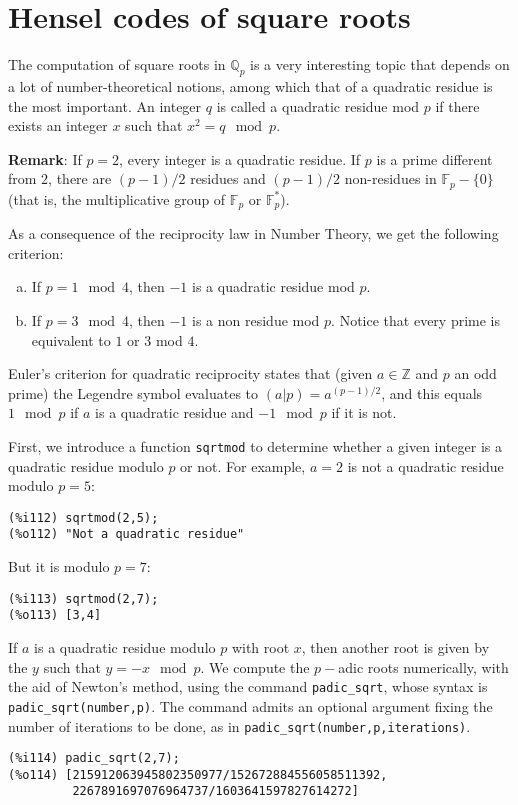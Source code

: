 \documentclass[fleqn]{cas-sc}
\begin{document}
\section{Hensel codes of square roots}\label{sec6}

\noindent The computation of square roots in $\mathbb{Q}_p$ is a very interesting
topic that depends on a lot of number-theoretical notions, among which that of a
quadratic residue is the most important.
An integer $q$ is called a quadratic residue mod $p$ if there exists an
integer $x$ such that  $x^2 =q \mod p$.

\noindent\textbf{Remark}: If $p=2$, every integer is a quadratic residue. 
If $p$ is a prime different from $2$, there are $(p-1)/2$ residues and 
$(p-1)/2$ non-residues in $\mathbb{F}_p-\{0\}$ (that is, the multiplicative
group of $\mathbb{F}_p$ or $\mathbb{F}^*_p$).

As a consequence of the reciprocity law in Number Theory, we get the following criterion:
\begin{enumerate}[(a)]\renewcommand{\theenumi}{\alph{enumi}}
	\item If $p=1 \mod 4$, then $-1$ is a quadratic residue mod $p$.
	\item If $p=3 \mod 4$, then $-1$ is a non residue mod $p$.
	Notice that every prime is equivalent to $1$ or $3$ mod $4$.
\end{enumerate}

Euler's criterion for quadratic reciprocity states that (given $a \in \mathbb{Z}$
and $p$ an odd prime) the Legendre symbol evaluates to $(a|p)=a^{(p-1)/2}$, 
and this equals $1\mod p$  if $a$ is a quadratic residue and $-1\mod p$ if it is not.

First, we introduce a function \texttt{sqrtmod} to determine whether a given integer
is a quadratic residue modulo $p$ or not. For example, $a=2$ is not a quadratic residue
modulo $p=5$:
\begin{verbatim}
(%i112)	sqrtmod(2,5);
(%o112)	"Not a quadratic residue"
\end{verbatim}
But it is modulo $p=7$:
\begin{verbatim}
(%i113)	sqrtmod(2,7);
(%o113)	[3,4]
\end{verbatim}

If $a$ is a quadratic residue modulo $p$ with root $x$, then another root is
given by the $y$ such that $y=-x \mod p$. We compute the $p-$adic roots numerically,
with the aid of Newton's method, using the command \texttt{padic\_sqrt}, whose syntax is
\texttt{padic\_sqrt(number,p)}. The command admits an optional argument fixing the number
of iterations to be done, as in \texttt{padic\_sqrt(number,p,iterations)}.
\begin{verbatim}
(%i114)	padic_sqrt(2,7);
(%o114)	[215912063945802350977/152672884556058511392,
         2267891697076964737/1603641597827614272]
\end{verbatim}
\end{document}
